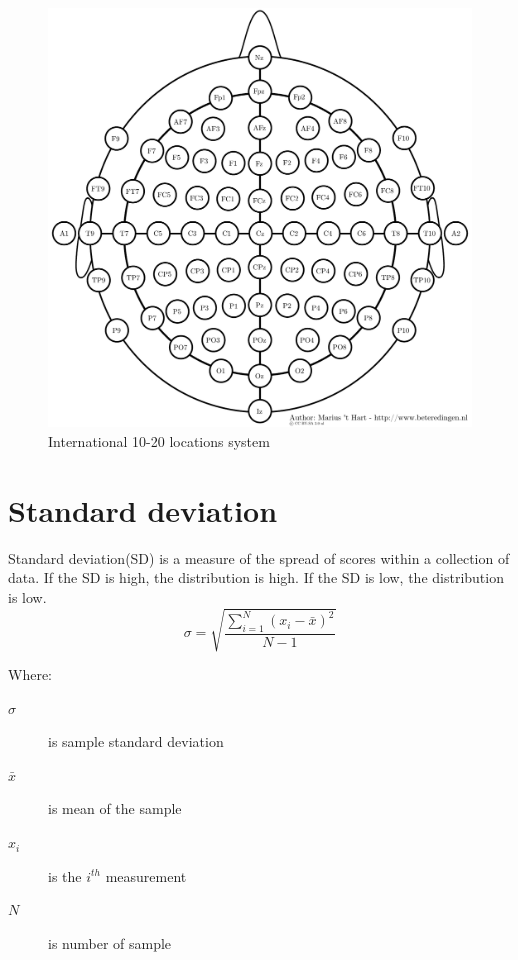 \begin{figure}[ht]
	\centering
	\includegraphics[scale = 0.5]{chapter3/35.pdf}
	\caption{International 10-20 locations system\cite{ref15}}
\end{figure}

\newpage
\section{Standard deviation}
\hspace{1.5cm} Standard deviation(SD) is a measure of the spread of scores within a collection of data. If the SD is high, the distribution is high. If the SD is low, the distribution is low.
\begin{equation}\label{3}
	 \sigma = \sqrt{\frac{ \sum\limits ^{N}_{i=1} (x_{i} - \bar{x})^2}{N - 1}} 
\end{equation}

Where:
\begin{description}
	\item [$\sigma$] is sample standard deviation
	\item [$\bar{x}$] is mean of the sample
	\item [$x_i$] is the $i^{th}$ measurement
	\item [$N$] is number of sample
\end{description}

